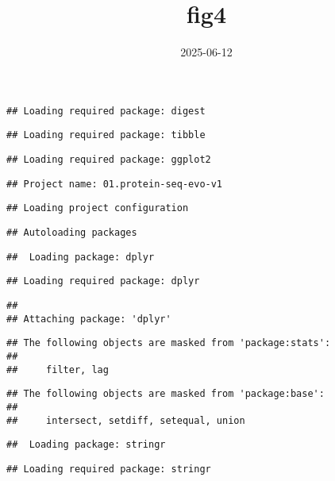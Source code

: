 \documentclass[
]{article}
\title{fig4}
\author{}
\date{\vspace{-2.5em}2025-06-12}
\begin{document}
\maketitle

\begin{verbatim}
## Loading required package: digest
\end{verbatim}

\begin{verbatim}
## Loading required package: tibble
\end{verbatim}

\begin{verbatim}
## Loading required package: ggplot2
\end{verbatim}

\begin{verbatim}
## Project name: 01.protein-seq-evo-v1
\end{verbatim}

\begin{verbatim}
## Loading project configuration
\end{verbatim}

\begin{verbatim}
## Autoloading packages
\end{verbatim}

\begin{verbatim}
##  Loading package: dplyr
\end{verbatim}

\begin{verbatim}
## Loading required package: dplyr
\end{verbatim}

\begin{verbatim}
## 
## Attaching package: 'dplyr'
\end{verbatim}

\begin{verbatim}
## The following objects are masked from 'package:stats':
## 
##     filter, lag
\end{verbatim}

\begin{verbatim}
## The following objects are masked from 'package:base':
## 
##     intersect, setdiff, setequal, union
\end{verbatim}

\begin{verbatim}
##  Loading package: stringr
\end{verbatim}

\begin{verbatim}
## Loading required package: stringr
\end{verbatim}
\end{document}

